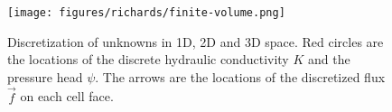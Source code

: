 \begin{figure}[!htbp]
\begin{center}
\texttt{[image: figures/richards/finite-volume.png]}
\end{center}
\caption{Discretization of unknowns in 1D, 2D and 3D space. Red circles are the locations of the discrete hydraulic conductivity $K$ and the pressure head $\psi$.
The arrows are the locations of the discretized flux $\vec f$ on each cell face.}
\label{fig:richards-finite-volume}
\end{figure}
